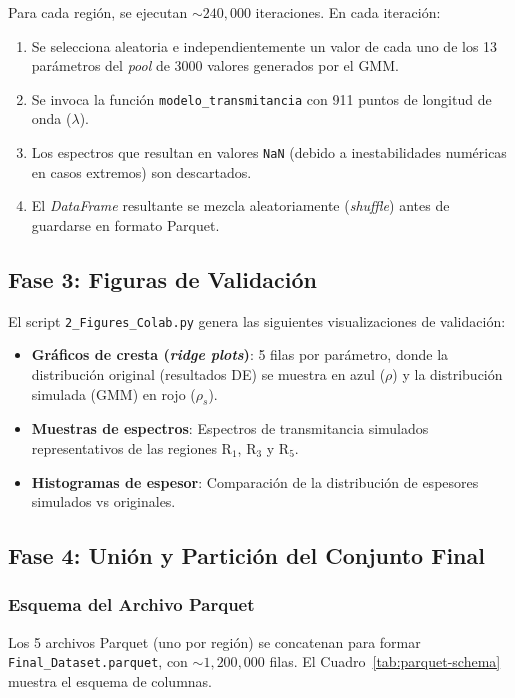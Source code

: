\documentclass{article}
\begin{document}
Para cada regi\'on, se ejecutan $\sim 240,000$ iteraciones. En cada iteraci\'on:
\begin{enumerate}
    \item Se selecciona aleatoria e independientemente un valor de cada uno de los 13 par\'ametros del \textit{pool} de 3000 valores generados por el GMM.
    \item Se invoca la funci\'on \texttt{modelo\_transmitancia} con 911 puntos de longitud de onda ($\lambda$).
    \item Los espectros que resultan en valores \texttt{NaN} (debido a inestabilidades num\'ericas en casos extremos) son descartados.
    \item El \textit{DataFrame} resultante se mezcla aleatoriamente (\textit{shuffle}) antes de guardarse en formato Parquet.
\end{enumerate}

\subsection{Fase 3: Figuras de Validaci\'on}

El script \texttt{2\_Figures\_Colab.py} genera las siguientes visualizaciones de validaci\'on:

\begin{itemize}
    \item \textbf{Gr\'aficos de cresta (\textit{ridge plots})}: 5 filas por par\'ametro, donde la distribuci\'on original (resultados DE) se muestra en azul ($\rho$) y la distribuci\'on simulada (GMM) en rojo ($\rho_s$).
    \item \textbf{Muestras de espectros}: Espectros de transmitancia simulados representativos de las regiones R$_1$, R$_3$ y R$_5$.
    \item \textbf{Histogramas de espesor}: Comparaci\'on de la distribuci\'on de espesores simulados vs originales.
\end{itemize}

\subsection{Fase 4: Uni\'on y Partici\'on del Conjunto Final}

\subsubsection{Esquema del Archivo Parquet}

Los 5 archivos Parquet (uno por regi\'on) se concatenan para formar \texttt{Final\_Dataset.parquet}, con $\sim 1,200,000$ filas. El Cuadro~\ref{tab:parquet-schema} muestra el esquema de columnas.
\end{document}
